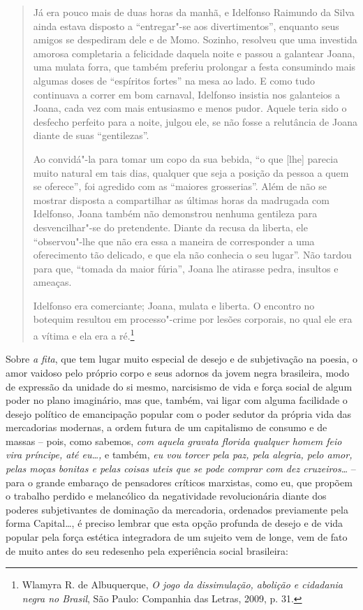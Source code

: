 \begin{quote}
Já era pouco mais de duas horas da manhã, e Idelfonso Raimundo da
Silva ainda estava disposto a ``entregar"-se aos divertimentos'', enquanto
seus amigos se despediram dele e de Momo. Sozinho, resolveu que uma
investida amorosa completaria a felicidade daquela noite e passou a
galantear Joana, uma mulata forra, que também preferiu prolongar a festa
consumindo mais algumas doses de ``espíritos fortes'' na mesa ao lado. E
como tudo continuava a correr em bom carnaval, Idelfonso insistia nos
galanteios a Joana, cada vez com mais entusiasmo e menos pudor. Aquele
teria sido o desfecho perfeito para a noite, julgou ele, se não fosse a
relutância de Joana diante de suas ``gentilezas''.

Ao convidá"-la para
tomar um copo da sua bebida, ``o que {[}lhe{]} parecia muito natural em
tais dias, qualquer que seja a posição da pessoa a quem se oferece'', foi
agredido com as ``maiores grosserias''. Além de não se mostrar disposta a
compartilhar as últimas horas da madrugada com Idelfonso, Joana também
não demonstrou nenhuma gentileza para desvencilhar"-se do pretendente.
Diante da recusa da liberta, ele ``observou"-lhe que não era essa a
maneira de corresponder a uma oferecimento tão delicado, e que ela não
conhecia o seu lugar''. Não tardou para que, ``tomada da maior fúria'',
Joana lhe atirasse pedra, insultos e ameaças.

Idelfonso era comerciante; Joana, mulata e liberta. O encontro no botequim resultou em
processo"-crime por lesões corporais, no qual ele era a vítima e ela era
a ré.\footnote{Wlamyra R. de Albuquerque, \emph{O jogo da
  dissimulação, abolição e cidadania negra no Brasil}, São Paulo:
  Companhia das Letras, 2009, p. 31.}
\end{quote}

Sobre \emph{a fita}, que tem lugar muito especial de desejo e de
subjetivação na poesia, o amor vaidoso pelo próprio corpo e seus adornos
da jovem negra brasileira, modo de expressão da unidade do si mesmo,
narcisismo de vida e força social de algum poder no plano imaginário,
mas que, também, vai ligar com alguma facilidade o desejo político de
emancipação popular com o poder sedutor da própria vida das mercadorias
modernas, a ordem futura de um capitalismo de consumo e de massas --
pois, como sabemos, \emph{com aquela gravata florida qualquer homem feio
vira príncipe, até eu\ldots{},} e também, \emph{eu vou torcer pela paz, pela
alegria, pelo amor, pelas moças bonitas e pelas coisas uteis que se pode
comprar com dez cruzeiros\ldots{}} -- para o grande embaraço de pensadores
críticos marxistas, como eu, que propõem o trabalho perdido e
melancólico da negatividade revolucionária diante dos poderes
subjetivantes de dominação da mercadoria, ordenados previamente pela
forma Capital\ldots{}, é preciso lembrar que esta opção profunda de desejo e
de vida popular pela força estética integradora de um sujeito vem de
longe, vem de fato de muito antes do seu redesenho pela experiência
social brasileira:

